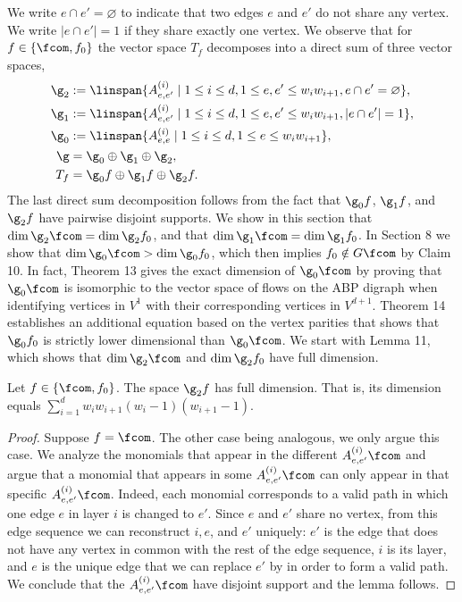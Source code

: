 We write $e\cap e'=\varnothing$ to indicate that two edges $e$ and $e'$ do not share any vertex. We write $|e\cap e'|=1$ if they share exactly one vertex. We observe that for $f\in\{\fcom,f_0\}$ the vector space $T_f$ decomposes into a direct sum of three vector spaces,
\begin{align*}
\g_2&:=\linspan\{A^{(i)}_{e,e'}\mid1\le i\le d,1\le e,e'\le w_iw_{i+1},e\cap e'=\varnothing\},\\
\g_1&:=\linspan\{A^{(i)}_{e,e'}\mid1\le i\le d,1\le e,e'\le w_iw_{i+1},|e\cap e'|=1\},\\
\g_0&:=\linspan\{A^{(i)}_{e,e}\mid1\le i\le d,1\le e\le w_iw_{i+1}\},\\
\g&=\g_0\oplus\g_1\oplus\g_2,\\
T_f&=\g_0f\oplus\g_1f\oplus\g_2f.
\end{align*}
The last direct sum decomposition follows from the fact that $\g_0f$, $\g_1f$, and $\g_2f$ have pairwise disjoint supports.
We show in this section that $\dim\g_2\fcom=\dim\g_2f_0$, and that $\dim\g_1\fcom=\dim\g_1f_0$. In Section 8 we show that $\dim\g_0\fcom>\dim\g_0f_0$, which then implies $f_0\notin G\fcom$ by Claim 10. In fact, Theorem 13 gives the exact dimension of $\g_0\fcom$ by proving that $\g_0\fcom$ is isomorphic to the vector space of flows on the ABP digraph when identifying vertices in $V^1$ with their corresponding vertices in $V^{d+1}$. Theorem 14 establishes an additional equation based on the vertex parities that shows that $\g_0f_0$ is strictly lower dimensional than $\g_0\fcom$.
We start with Lemma 11, which shows that $\dim\g_2\fcom$ and $\dim\g_2f_0$ have full dimension.
\begin{lemma}
Let $f\in\{\fcom,f_0\}$. The space $\g_2f$ has full dimension. That is, its dimension equals $\sum_{i=1}^d w_iw_{i+1}(w_i-1)(w_{i+1}-1)$.
\end{lemma}
\begin{proof}
Suppose $f=\fcom$. The other case being analogous, we only argue this case.
We analyze the monomials that appear in the different $A^{(i)}_{e,e'}\fcom$ and argue that a monomial that appears in some $A^{(i)}_{e,e'}\fcom$ can only appear in that specific $A^{(i)}_{e,e'}\fcom$. Indeed, each monomial corresponds to a valid path in which one edge $e$ in layer $i$ is changed to $e'$. Since $e$ and $e'$ share no vertex, from this edge sequence we can reconstruct $i,e$, and $e'$ uniquely: $e'$ is the edge that does not have any vertex in common with the rest of the edge sequence, $i$ is its layer, and $e$ is the unique edge that we can replace $e'$ by in order to form a valid path. We conclude that the $A^{(i)}_{e,e'}\fcom$ have disjoint support and the lemma follows.
\end{proof}
